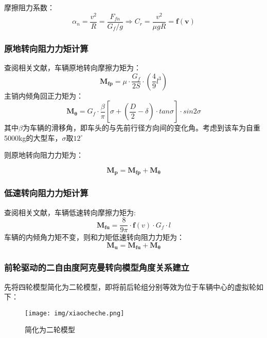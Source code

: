 \documentclass[withoutpreface,bwprint]{cumcmthesis} %
\begin{document}
摩擦阻力系数：
\begin{equation}
    \alpha_n = \frac{v^2}{R} = \frac{F_{fn}}{G_f/g} \Longrightarrow C_{r} = \frac{v^2}{\mu g R} = \mathbf{f(v)}
\end{equation}

\subsubsection{原地转向阻力力矩计算}



查阅相关文献\supercite{[1]}，车辆原地转向摩擦力矩为：
\begin{equation}
    \mathbf{M_{fp}}=\mu \cdot \frac{G_f}{2S}\cdot (\frac{4}{9} l^3)
\end{equation}
主销内倾角回正力矩为：
\begin{equation}
    \mathbf{M_\theta}=G_f \cdot \frac{\beta}{\pi}[\sigma+(\frac{D}{2}-\delta)\cdot tan \sigma] \cdot sin2\sigma
\end{equation}
其中$\beta$为车辆的滑移角，即车头的与先前行径方向间的变化角。考虑到该车为自重5000kg的大型车，$\sigma$取$12^\circ $

则原地转向阻力力矩为：


\begin{equation}
    \label{persistFriction}
    \mathbf{M_p}=\mathbf{M_{fp}}+\mathbf{M_\theta}
\end{equation}

\subsubsection{低速转向阻力力矩计算}
查阅相关文献\supercite{[1]}，车辆低速转向摩擦力矩为:
\begin{equation}
    \mathbf{M_{fu}}=\frac{8}{9\pi}\cdot \mathbf{f}(v) \cdot G_f \cdot l
\end{equation}
车辆的内倾角力矩不变，则和力矩低速转向阻力力矩为：
\begin{equation}
    \label{lowSpeedFriction}
    \mathbf{M_u}=\mathbf{M_{fu}}+\mathbf{M_\theta}
\end{equation}

\subsubsection{前轮驱动的二自由度阿克曼转向模型角度关系建立}
先将四轮模型简化为二轮模型，即将前后轮组分别等效为位于车辆中心的虚拟轮如下：
\begin{figure}[htbp]
    \centering
    \texttt{[image: img/xiaocheche.png]}
     \captionsetup{font=small, position=below}
    \caption{简化为二轮模型}
\end{figure}
\end{document}
